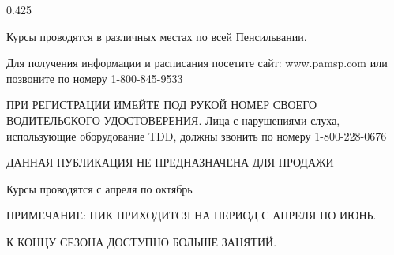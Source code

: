 \begin{langblock}{0.425}
\begin{rus}
		
		Курсы проводятся в различных местах по всей Пенсильвании.
		
		
		
		Для получения информации и расписания посетите сайт: www.pamsp.com или позвоните по номеру 1-800-845-9533 
		
		ПРИ РЕГИСТРАЦИИ ИМЕЙТЕ ПОД РУКОЙ НОМЕР СВОЕГО ВОДИТЕЛЬСКОГО УДОСТОВЕРЕНИЯ.  Лица с нарушениями слуха, использующие оборудование TDD, должны звонить по номеру 1-800-228-0676
		
		
		
		ДАННАЯ ПУБЛИКАЦИЯ НЕ ПРЕДНАЗНАЧЕНА ДЛЯ ПРОДАЖИ
		
		Курсы проводятся с апреля по октябрь
		
		ПРИМЕЧАНИЕ: ПИК ПРИХОДИТСЯ НА ПЕРИОД С АПРЕЛЯ ПО ИЮНЬ.
		
		К КОНЦУ СЕЗОНА ДОСТУПНО БОЛЬШЕ ЗАНЯТИЙ.
\end{rus}
\end{langblock}